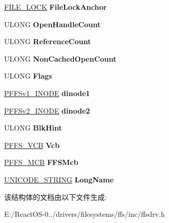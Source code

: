\begin{DoxyCompactItemize}
\item 
\mbox{\label{struct___f_f_s___f_c_b_a39a49f5af0fac8311bd87ccfd384ba31}} 
\hyperlink{struct___f_i_l_e___l_o_c_k}{F\+I\+L\+E\+\_\+\+L\+O\+CK} {\bfseries File\+Lock\+Anchor}
\item 
\mbox{\label{struct___f_f_s___f_c_b_a34e4f0beb82683b280c3be27afd579df}} 
U\+L\+O\+NG {\bfseries Open\+Handle\+Count}
\item 
\mbox{\label{struct___f_f_s___f_c_b_ac949f9b52d88de7c617c8c91963fee15}} 
U\+L\+O\+NG {\bfseries Reference\+Count}
\item 
\mbox{\label{struct___f_f_s___f_c_b_af916c56ceb4f043ad6dba1b5d1763ca6}} 
U\+L\+O\+NG {\bfseries Non\+Cached\+Open\+Count}
\item 
\mbox{\label{struct___f_f_s___f_c_b_afcd9d6f2931c41b119e884bd0db1627e}} 
U\+L\+O\+NG {\bfseries Flags}
\item 
\mbox{\label{struct___f_f_s___f_c_b_abd1d46d4709268cb8069438825e51585}} 
\hyperlink{structufs1__dinode}{P\+F\+F\+Sv1\+\_\+\+I\+N\+O\+DE} {\bfseries dinode1}
\item 
\mbox{\label{struct___f_f_s___f_c_b_a157edc06c296f9c6a0d23ca4235b5ad2}} 
\hyperlink{structufs2__dinode}{P\+F\+F\+Sv2\+\_\+\+I\+N\+O\+DE} {\bfseries dinode2}
\item 
\mbox{\label{struct___f_f_s___f_c_b_a11a8ecfa7781e620f3cc48b9e27800be}} 
U\+L\+O\+NG {\bfseries Blk\+Hint}
\item 
\mbox{\label{struct___f_f_s___f_c_b_ae7866a629194aa7da7de15a491ad9fd3}} 
\hyperlink{struct___f_f_s___v_c_b}{P\+F\+F\+S\+\_\+\+V\+CB} {\bfseries Vcb}
\item 
\mbox{\label{struct___f_f_s___f_c_b_a22f4a1b04e39c4edb8d79ca85b710bd1}} 
\hyperlink{struct___f_f_s___m_c_b}{P\+F\+F\+S\+\_\+\+M\+CB} {\bfseries F\+F\+S\+Mcb}
\item 
\mbox{\label{struct___f_f_s___f_c_b_aa512cc9e2033d141e8820a90b6de8316}} 
\hyperlink{struct___u_n_i_c_o_d_e___s_t_r_i_n_g}{U\+N\+I\+C\+O\+D\+E\+\_\+\+S\+T\+R\+I\+NG} {\bfseries Long\+Name}
\end{DoxyCompactItemize}


该结构体的文档由以下文件生成\+:\begin{DoxyCompactItemize}
\item 
E\+:/\+React\+O\+S-\/0../drivers/filesystems/ffs/inc/ffsdrv.\+h\end{DoxyCompactItemize}
